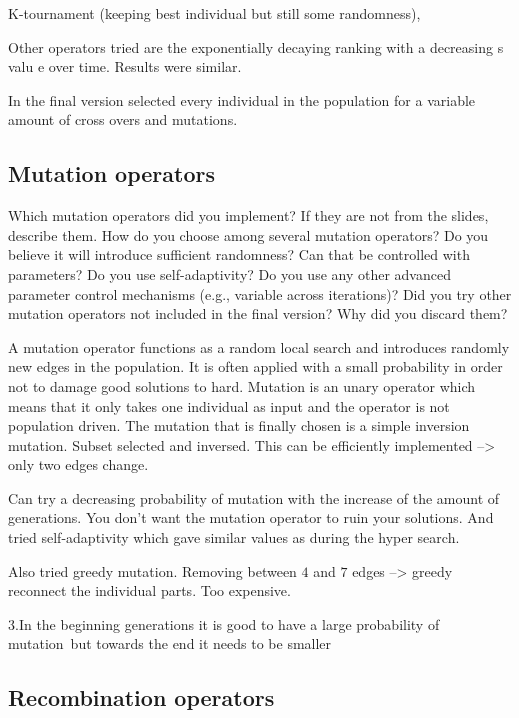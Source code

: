 \documentclass[a4paper,10pt]{article}
\newcommand{\ReplaceMe}[1]{{\color{blue}#1}}
\begin{document}
K-tournament (keeping best individual but still some randomness),

Other operators tried are the exponentially decaying ranking with a decreasing s valu  e over time. Results were similar. 

In the final version selected every individual in the population for a variable amount of cross overs and mutations. 




\subsection{Mutation operators}

\ReplaceMe{Which mutation operators did you implement? If they are not from the slides, describe them. How do you choose among several mutation operators? Do you believe it will introduce sufficient randomness? Can that be controlled with parameters? Do you use self-adaptivity? Do you use any other advanced parameter control mechanisms (e.g., variable across iterations)? Did you try other mutation operators not included in the final version? Why did you discard them?}

A mutation operator functions as a random local search and introduces randomly new edges in the population. It is often applied with a small probability in order not to damage good solutions to hard. Mutation is an unary operator which means that it only takes one individual as input and the operator is not population driven.
The mutation that is finally chosen is a simple inversion mutation. Subset selected and inversed. This can be efficiently implemented --> only two edges change. 

Can try a decreasing probability of mutation with the increase of the amount of generations. You don't want the mutation operator to ruin your solutions. And tried self-adaptivity which gave similar values as during the hyper search. 

Also tried greedy mutation. Removing between $4$ and $7$ edges --> greedy reconnect the individual parts. Too expensive. 


3.In the beginning generations it is good to have a large probability of mutation but towards the end it needs to be smaller


\subsection{Recombination operators}
\end{document}
